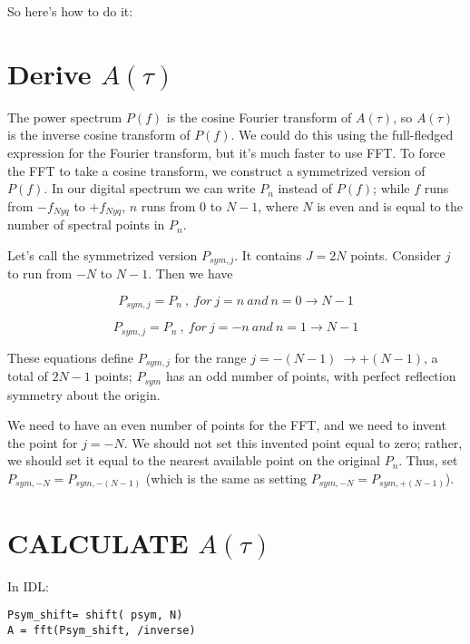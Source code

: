 \documentclass[preprint]{aastex}
\begin{document}
So here's how to do it:

\section{Derive $A(\tau)$}

The power spectrum $P(f)$ is the cosine Fourier transform of $A(\tau)$,
so $A(\tau)$ is the inverse cosine transform of $P(f)$. We could do this
using the full-fledged expression for the Fourier transform, but it's
much faster to use FFT. To force the FFT to take a cosine transform, we
construct a symmetrized version of $P(f)$. In our digital spectrum we
can write $P_n$ instead of $P(f)$; while $f$ runs from $-f_{Nyq}$ to
$+f_{Nyq}$, $n$ runs from 0 to $N-1$, where $N$ is even and is equal to
the number of spectral points in $P_n$.

Let's call the symmetrized version $P_{sym,j}$. It contains $J= 2N$
points. Consider $j$ to run from $-N$ to $N-1$. Then we have 

\begin{mathletters}
\begin{equation}
P_{sym,j} = P_{n} \ , \ for \ j=n \ and \ n=0 \to N-1
\end{equation}

\begin{equation}
P_{sym,j} = P_{n} \ , \ for \ j=-n \ and \ n=1 \to N-1
\end{equation}
\end{mathletters}

\noindent These equations define $P_{sym,j}$ for the range $j=-(N-1) \ \to
  +(N-1)$, a total of $2N-1$ points; $P_{sym}$ has an odd number of
  points, with perfect reflection symmetry about the origin.

We need to have an even number of points for the FFT, and we need to
invent the point for $j=-N$. We should not set this invented point equal
to zero; rather, we should set it equal to the nearest available point
on the original $P_n$. Thus, set $P_{sym,-N} = P_{sym, -(N-1)}$ (which is
  the same as setting $P_{sym,-N} = P_{sym, +(N-1)}$). 

\section{CALCULATE $A(\tau)$}

In IDL:

\begin{verbatim}
Psym_shift= shift( psym, N)
A = fft(Psym_shift, /inverse)
\end{verbatim}
\end{document}
